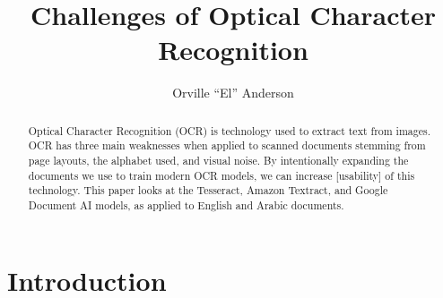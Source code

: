 \documentclass[sigplan,screen,nonacm]{acmart-tagged}
\begin{document}
\title{Challenges of Optical Character Recognition}
\author{Orville ``El'' Anderson}

\begin{abstract}
Optical Character Recognition (OCR) is technology used to extract text from images. OCR has three main weaknesses when applied to scanned documents stemming from page layouts, the alphabet used, and visual noise. By intentionally expanding the documents we use to train modern OCR models, we can increase [usability] of this technology. This paper looks at the Tesseract, Amazon Textract, and Google Document AI models, as applied to English and Arabic documents.
\end{abstract}

\doclicenseThis



\maketitle

\section{Introduction}
\label{sec:introduction}
\end{document}
